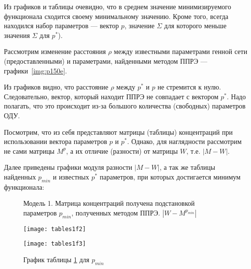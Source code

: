 Из графиков и таблицы очевидно, что в среднем значение минимизируемого 
функционала сходится своему минимальному значению. Кроме того, всегда находился 
набор параметров — вектор $p$, значение $\Sigma$ для которого меньше значения 
$\Sigma$ для $p^*$).

Рассмотрим изменение расстояния $\rho$ между известными параметрами генной сети 
(предоставленными) и параметрами, найденными методом ППРЭ — 
графики~\ref{img:p150e}.

Из графиков видно, что расстояние $\rho$ между $p^*$ и $p$ не стремится к нулю.
Следовательно, вектор, который находит ППРЭ не совпадает с вектором $p^*$. 
Надо полагать, что это происходит из-за большого количества (свободных) 
параметров ОДУ.

Посмотрим, что из себя представляют матрицы (таблицы) концентраций при 
использовании вектора параметров $p$ и $p^*$. Однако, для наглядности рассмотрим 
не сами матрицы $M^p$, а их отличие (разности) от матрицы $W$, т.е. $|M - W|$.

Далее приведены графики модуля разности $|M - W|$, а так же таблицы найденных 
$p_{min}$ и известных $p^*$ параметров, при которых достигается минимум 
функционала:

\begin{figure}[h]
  \begin{minipage}[h]{0.5\linewidth}
    
    \caption{Модель 1.Матрица концентраций получена параметрами $p^*$, 
    предлагаемыми DREAM6 в качестве ответа. $|W - M^{p^*}|$}
    \label{m1p2}
  \end{minipage}
  \hfill
  \begin{minipage}[h]{0.5\linewidth}
    
    \caption{Модель 1. Матрица концентраций получена подстановкой 
    параметров $p_{min}$, полученных методом ППРЭ. $|W - M^{p_{min}}|$}
    \label{m1p3}
  \end{minipage}
\end{figure}

\begin{figure}[h]
  \begin{minipage}[h]{0.5\linewidth}
    \texttt{[image: tables1f2]}
    \caption{График таблицы \ref{m1p2} для $p^*$}
    \label{m1p1}
  \end{minipage}
  \hfill
  \begin{minipage}[h]{0.5\linewidth}
    \texttt{[image: tables1f3]}
    \caption{График таблицы \ref{m1p3} для $p_{min}$}
    \label{m2p1}
  \end{minipage}
\end{figure}


